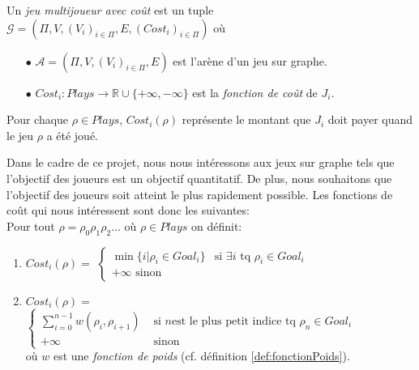 
\begin{defi}
	Un \textit{jeu multijoueur avec coût} est un tuple $\mathcal{G} = (\Pi ,V ,(V_{i})_{i \in \Pi} ,E ,(Cost_{i})_{i \in \Pi})$ où
	\begin{enumerate}
		\item[$\bullet$] $\mathcal{A} = (\Pi ,V ,(V_{i})_{i \in \Pi} ,E )$ est l'arène d'un jeu sur graphe.
		\item[$\bullet$] $Cost_{i}: Plays \rightarrow \mathbb{R} \cup \{ +\infty , -\infty \} $ est la \textit{fonction de coût} de $J_{i}$. 
	\end{enumerate}
\end{defi}

\begin{rem}
	Pour chaque $\rho \in Plays$, $Cost_{i}(\rho)$ représente le montant que $J_{i}$ doit payer quand le jeu $\rho$ a été joué.
\end{rem}

\begin{exemple}
  Dans le cadre de ce projet, nous nous intéressons aux jeux sur graphe tels que l'objectif des joueurs est un objectif quantitatif. De plus, nous souhaitons que l'objectif des joueurs soit atteint le plus rapidement possible. Les fonctions de coût qui nous intéressent sont donc les suivantes: \\
	
	Pour tout  $\rho = \rho _{0} \rho _{1} \rho _{2} \ldots $ où $\rho \in Plays$ on définit:
	\begin{enumerate}
	\item $Cost_{i}(\rho) = $ $\begin{cases} 
									\min \{ i | \rho _{i} \in Goal_{i} \} & \text{si } \exists i \text{ tq } \rho _{i} \in Goal_{i} \\
									+\infty \text{ sinon}
									\end{cases}$
	\item $Cost_{i}(\rho) = $ $\begin{cases}
									\sum_{i = 0}^{n-1} w(\rho_{i},\rho_{i+1}) & \text{ si } n \text{est le plus petit indice tq } \rho_{n}\in 					  Goal_{i}\\
									+\infty & \text{ sinon}
									\end{cases}$ \\
									où $w$ est une \textit{fonction de poids} (cf. définition \ref{def:fonctionPoids}).
	\end{enumerate}
\end{exemple}

